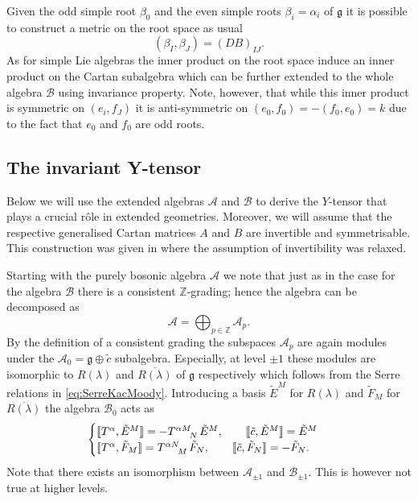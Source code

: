 Given the odd simple root $\beta_0$ and the even simple roots $\beta_i=\alpha_i$ of $\mathfrak{g}$ it is possible to construct a metric on the root space as usual
\begin{equation}
    (\beta_I,\beta_J) = (DB)_{IJ}.
\end{equation}
As for simple Lie algebras the inner product on the root space induce an inner product on the Cartan subalgebra which can be further extended to the whole algebra $\mathscr{B}$ using invariance property. Note, however, that while this inner product is symmetric on $(e_i,f_J)$ it is anti-symmetric on $(e_0,f_0)=-(f_0,e_0)=k$ due to the fact that $e_0$ and $f_0$ are odd roots.    


\subsection{The invariant Y-tensor\label{sec:InvYTensor}}
Below we will use the extended algebras $\mathscr{A}$ and $\mathscr{B}$ to derive the $Y$-tensor that plays a crucial rôle in extended geometries. Moreover, we will assume that the respective generalised Cartan matrices $A$ and $B$ are invertible and symmetrisable. This construction was given in \cite{CederwallPalmkvist2017} where the assumption of invertibility was relaxed.

Starting with the purely bosonic algebra $\mathscr{A}$ we note that just as in the case for the algebra $\mathscr{B}$ there is a consistent $\mathbb{Z}$-grading; hence the algebra can be decomposed as 
\begin{equation}
    \mathscr{A} =\bigoplus_{p\in \mathbb{Z}}\mathscr{A}_p.
\end{equation}
By the definition of a consistent grading the subspaces $\mathscr{A}_p$ are again modules under the $\mathscr{A}_0=\mathfrak{g}\oplus \tilde{c}$ subalgebra. Especially, at level $\pm 1$ these modules are isomorphic to $R(\lambda)$ and $\overbar{R(\lambda)}$ of $\mathfrak{g}$ respectively which follows from the Serre relations in \eqref{eq:SerreKacMoody}. Introducing a basis $\tilde{E}^M$ for $R(\lambda)$ and $\tilde{F}_M$ for $\overbar{R(\lambda)}$ the algebra $\mathscr{B}_{0}$ acts as 
\begin{equation}\label{eq:A0Action}
    \begin{cases}
        \llbracket T^\alpha, \tilde{E}^M\rrbracket = -\tensor{T}{^{\alpha M}_N}\tilde{E}^M,\qquad \llbracket \tilde{c},\tilde{E}^M\rrbracket= \tilde{E}^M\\
        \llbracket T^\alpha, \tilde{F}_M\rrbracket = \tensor{T}{^{\alpha N}_M}\tilde{F}_N,\qquad \llbracket \tilde{c},\tilde{F}_N\rrbracket= -\tilde{F}_N. 
    \end{cases}
\end{equation}
Note that there exists an isomorphism between $\mathscr{A}_{\pm 1}$ and $\mathscr{B}_{\pm 1}$. This is however not true at higher levels. 

